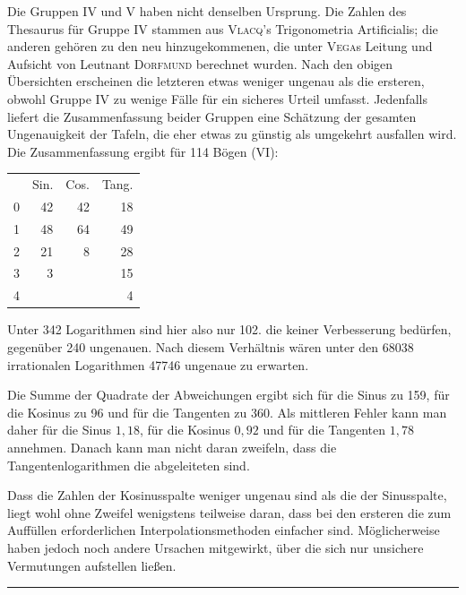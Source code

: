 Die Gruppen IV und V haben nicht denselben Ursprung. Die Zahlen des Thesaurus für Gruppe IV stammen aus \textsc{Vlacq}'s Trigonometria Artificialis; die anderen gehören zu den neu hinzugekommenen, die unter \textsc{Vega}s Leitung und Aufsicht von Leutnant \textsc{Dorfmund} berechnet wurden. Nach den obigen Übersichten erscheinen die letzteren etwas weniger ungenau als die ersteren, obwohl Gruppe IV zu wenige Fälle für ein sicheres Urteil umfasst. Jedenfalls liefert die Zusammenfassung beider Gruppen eine Schätzung  der gesamten Ungenauigkeit der Tafeln, die eher etwas zu günstig als umgekehrt ausfallen wird. Die Zusammenfassung ergibt für 114 Bögen (VI):
\begin{center}\begin{tabular}{r r r r}
& Sin. & Cos. & Tang.\\
0&42&42&18\\
1&48&64&49\\
2&21&8&28\\
3&3&&15\\
4&&&4
\end{tabular}\end{center}
Unter 342 Logarithmen sind hier also nur 102. die keiner Verbesserung bedürfen, gegenüber 240 ungenauen. Nach diesem Verhältnis wären unter den 68038 irrationalen Logarithmen 47746 ungenaue zu erwarten.

Die Summe der Quadrate der Abweichungen ergibt sich für die Sinus zu 159, für die Kosinus zu 96 und für die Tangenten zu 360. Als mittleren Fehler kann man daher für die Sinus $1{,}18$, für die Kosinus $0{,}92$ und für die Tangenten $1{,}78$ annehmen. Danach kann man nicht daran zweifeln, dass die Tangentenlogarithmen die abgeleiteten sind.

\begin{samepage}
Dass die Zahlen der Kosinusspalte weniger ungenau sind als die der Sinusspalte, liegt wohl ohne Zweifel wenigstens teilweise daran, dass bei den ersteren die zum Auffüllen erforderlichen Interpolationsmethoden einfacher sind. Möglicherweise haben jedoch noch andere Ursachen mitgewirkt, über die sich nur unsichere Vermutungen aufstellen ließen.
\begin{center}\bigskip\rule{.3\linewidth}{.4pt}\end{center}
\end{samepage}
